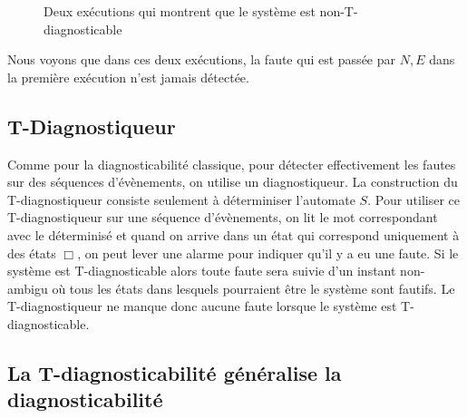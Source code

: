 \documentclass[conference]{IEEEtran}
\begin{document}
\begin{figure}[H]
  \caption{Deux ex\'ecutions qui montrent que le syst\`eme est non-T-diagnosticable}
  \begin{center}
  \end{center}
\end{figure}

Nous voyons que dans ces deux ex\'ecutions, la faute qui est pass\'ee par $N,E$ dans la premi\`ere ex\'ecution n'est jamais d\'etect\'ee.

\subsection{T-Diagnostiqueur}
Comme pour la diagnosticabilité classique, pour détecter effectivement les fautes sur des séquences d'évènements, on utilise un diagnostiqueur.
La construction du T-diagnostiqueur consiste seulement à d\'eterminiser l'automate $S$. Pour utiliser ce T-diagnostiqueur sur une séquence d'évènements, on lit le mot correspondant avec le déterminisé et quand on arrive dans un \'etat qui correspond uniquement à des \'etats $\Box$, on peut lever une alarme pour indiquer qu'il y a eu une faute. Si le système est T-diagnosticable alors toute faute sera suivie d'un instant non-ambigu où tous les états dans lesquels pourraient être le système sont fautifs. Le T-diagnostiqueur ne manque donc aucune faute lorsque le système est T-diagnosticable.

\subsection{La T-diagnosticabilité généralise la diagnosticabilité}
\end{document}
